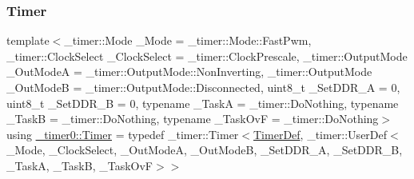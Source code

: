 \subsubsection{\texorpdfstring{Timer}{Timer}}
{\footnotesize\ttfamily template$<$\+\_\+timer\+::\+Mode \+\_\+\+Mode = \+\_\+timer\+::\+Mode\+::\+Fast\+Pwm, \+\_\+timer\+::\+Clock\+Select \+\_\+\+Clock\+Select = \+\_\+timer\+::\+Clock\+Prescale, \+\_\+timer\+::\+Output\+Mode \+\_\+\+Out\+ModeA = \+\_\+timer\+::\+Output\+Mode\+::\+Non\+Inverting, \+\_\+timer\+::\+Output\+Mode \+\_\+\+Out\+ModeB = \+\_\+timer\+::\+Output\+Mode\+::\+Disconnected, uint8\+\_\+t \+\_\+\+Set\+D\+D\+R\+\_\+A = 0, uint8\+\_\+t \+\_\+\+Set\+D\+D\+R\+\_\+B = 0, typename \+\_\+\+TaskA  = \+\_\+timer\+::\+Do\+Nothing, typename \+\_\+\+TaskB  = \+\_\+timer\+::\+Do\+Nothing, typename \+\_\+\+Task\+OvF  = \+\_\+timer\+::\+Do\+Nothing$>$ \\
using \hyperlink{namespace__timer0_a487a8b66274244234504d39d898e6b51}{\+\_\+timer0\+::\+Timer} = typedef \+\_\+timer\+::\+Timer$<$\hyperlink{struct__timer0_1_1TimerDef}{Timer\+Def}, \+\_\+timer\+::\+User\+Def$<$\+\_\+\+Mode, \+\_\+\+Clock\+Select, \+\_\+\+Out\+ModeA, \+\_\+\+Out\+ModeB, \+\_\+\+Set\+D\+D\+R\+\_\+A, \+\_\+\+Set\+D\+D\+R\+\_\+B, \+\_\+\+TaskA, \+\_\+\+TaskB, \+\_\+\+Task\+OvF$>$$>$}

